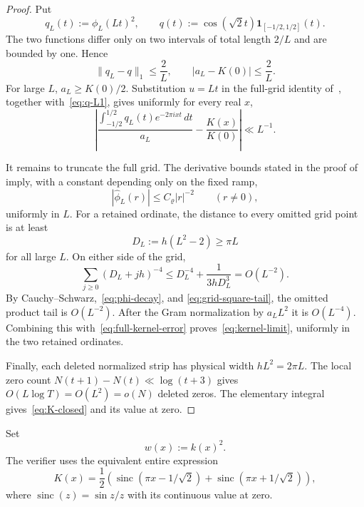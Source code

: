 \documentclass[11pt]{article}
\begin{document}
\begin{proof}
Put
\[
 q_L(t):=\phi_L(Lt)^2,
 \qquad q(t):=\cos(\sqrt2t)\mathbf1_{[-1/2,1/2]}(t).
\]
The two functions differ only on two intervals of total length $2/L$ and
are bounded by one.  Hence
\begin{equation}\label{eq:q-L1}
 \|q_L-q\|_1\le\frac2L,
 \qquad |a_L-K(0)|\le\frac2L.
\end{equation}
For large $L$, $a_L\ge K(0)/2$.  Substitution $u=Lt$ in the full-grid
identity of~\cite[Lemma~2.2]{Claude26}, together with~\eqref{eq:q-L1}, gives
uniformly for every real $x$,
\begin{equation}\label{eq:full-kernel-error}
 \left|
 \frac{\displaystyle\int_{-1/2}^{1/2}
 q_L(t)e^{-2\pi ixt}\,dt}{a_L}-\frac{K(x)}{K(0)}
 \right|\ll L^{-1}.
\end{equation}

It remains to truncate the full grid.  The derivative bounds stated in the
proof of~\cite[Theorem~D]{Claude26} imply, with a constant depending only on
the fixed ramp,
\begin{equation}\label{eq:phi-decay}
 |\widehat\phi_L(r)|\le C_\varrho |r|^{-2}\qquad(r\ne0),
\end{equation}
uniformly in $L$.  For a retained ordinate, the distance to every omitted
grid point is at least
\[
 D_L:=h(L^2-2)\ge\pi L
\]
for all large $L$.  On either side of the grid,
\begin{equation}\label{eq:grid-square-tail}
 \sum_{j\ge0}(D_L+jh)^{-4}
 \le D_L^{-4}+\frac1{3hD_L^3}=O(L^{-2}).
\end{equation}
By Cauchy--Schwarz,~\eqref{eq:phi-decay}, and
\eqref{eq:grid-square-tail}, the omitted product tail is $O(L^{-2})$.
After the Gram normalization by $a_LL^2$ it is $O(L^{-4})$.  Combining this
with~\eqref{eq:full-kernel-error} proves~\eqref{eq:kernel-limit}, uniformly
in the two retained ordinates.

Finally, each deleted normalized strip has physical width
$hL^2=2\pi L$.  The local zero count
$N(t+1)-N(t)\ll\log(t+3)$ gives $O(L\log T)=O(L^2)=o(N)$ deleted zeros.
The elementary integral gives~\eqref{eq:K-closed} and its value at zero.
\end{proof}

Set
\begin{equation}\label{eq:w-def}
 w(x):=k(x)^2.
\end{equation}
The verifier uses the equivalent entire expression
\begin{equation}\label{eq:sinc}
 K(x)=\frac12\left(
 \operatorname{sinc}(\pi x-1/\sqrt2)
 +\operatorname{sinc}(\pi x+1/\sqrt2)\right),
\end{equation}
where $\operatorname{sinc}(z)=\sin z/z$ with its continuous value at zero.
\end{document}
